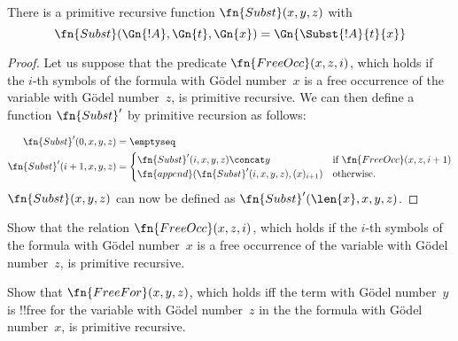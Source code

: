 \documentclass[../../include/open-logic-section]{subfiles}
\begin{document}

\begin{prop}
There is a primitive recursive function $\fn{Subst}(x, y, z)$ with
\[
\fn{Subst}(\Gn{!A}, \Gn{t}, \Gn{x}) = \Gn{\Subst{!A}{t}{x}}
\]
\end{prop}

\begin{proof}
Let us suppose that the predicate $\fn{FreeOcc}(x, z, i)$, which holds
if the $i$-th symbols of the formula with G\"odel number~$x$ is a free
occurrence of the variable with G\"odel number~$z$, is primitive
recursive.  We can then define a function $\fn{Subst}'$ by primitive
recursion as follows:

\begin{align*}
\fn{Subst}'(0, x, y, z) & = \emptyseq \\
\fn{Subst}'(i + 1, x, y, z) & =
\begin{cases}
\fn{Subst}'(i, x, y, z) \concat y & \text{if $\fn{FreeOcc}(x, z, i+1)$} \\
\fn{append}(\fn{Subst}'(i, x, y, z), (x)_{i+1}) & \text{otherwise.}
\end{cases}
\end{align*}
$\fn{Subst}(x, y, z)$ can now be defined as $\fn{Subst}'(\len{x}, x, y, z)$.
\end{proof}

\begin{prob}
Show that the relation $\fn{FreeOcc}(x, z, i)$, which holds if the
$i$-th symbols of the formula with G\"odel number~$x$ is a free
occurrence of the variable with G\"odel number~$z$, is primitive
recursive.
\end{prob}

\begin{prob}
Show that $\fn{FreeFor}(x, y, z)$, which holds iff the term with
G\"odel number~$y$ is !!{free for} the variable with G\"odel
number~$z$ in the the formula with G\"odel number~$x$, is primitive
recursive.
\end{prob}
\end{document}

